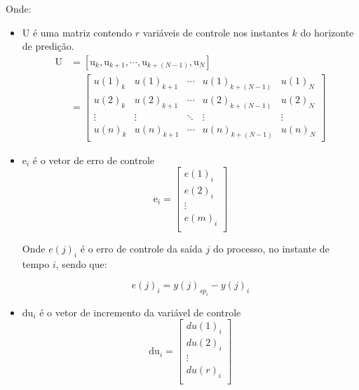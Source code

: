 \noindent
Onde: 
\begin{itemize}
	\item $\mathrm{U}$ é uma matriz contendo $r$ variáveis de controle nos instantes $k$ do horizonte de predição.
        \begin{equation}
            \label{eq:mpc_control_signal_matrix}
            \begin{aligned}
                \mathrm{U} &= [\mathrm{u}_{k}, \mathrm{u}_{k+1}, \cdots, \mathrm{u}_{k+(N-1)}, \mathrm{u}_N] \\
                &=
                \begin{bmatrix}
                    u(1)_{k} & u(1)_{k+1} & \cdots & u(1)_{k+(N-1)} & u(1)_N		\\
                    u(2)_{k} & u(2)_{k+1} & \cdots & u(2)_{k+(N-1)} & u(2)_N		\\
                    \vdots & \vdots & \ddots & \vdots & \vdots						\\
                    u(n)_{k} & u(n)_{k+1} & \cdots & u(n)_{k+(N-1)} & u(n)_N	
                \end{bmatrix}
            \end{aligned}
        \end{equation}
		
	\item $\mathrm{e}_i$ é o vetor de erro de controle
		\begin{equation}
			\mathrm{e}_i =
			\begin{bmatrix}
				e(1)_i \\
				e(2)_i \\
				\vdots \\
				e(m)_i \\
			\end{bmatrix}
        \end{equation}
        
        Onde $e(j)_i$ é o erro de controle da saída $j$ do processo, no instante de tempo $i$, sendo que:

        \begin{equation}
			e(j)_i = y(j)_{sp_i} - y(j)_i               %
        \end{equation}
		
	\item $\mathrm{du}_i$ é o vetor de incremento da variável de controle
        \begin{equation}
            \mathrm{du}_i =
            \begin{bmatrix}
                du(1)_i \\
                du(2)_i \\
                \vdots \\
                du(r)_i \\
            \end{bmatrix}
        \end{equation}


\end{itemize}
